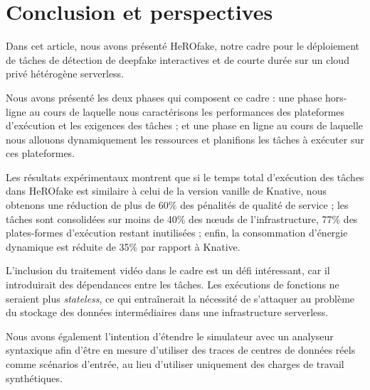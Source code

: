 \section{Conclusion et perspectives}

Dans cet article, nous avons présenté HeROfake, notre cadre pour le déploiement de tâches de détection de deepfake interactives et de courte durée sur un cloud privé hétérogène serverless.

Nous avons présenté les deux phases qui composent ce cadre : une phase hors-ligne au cours de laquelle nous caractérisons les performances des plateformes d'exécution et les exigences des tâches ; et une phase en ligne au cours de laquelle nous allouons dynamiquement les ressources et planifions les tâches à exécuter sur ces plateformes.

Les résultats expérimentaux montrent que si le temps total d'exécution des tâches dans HeROfake est similaire à celui de la version vanille de Knative, nous obtenons une réduction de plus de 60\% des pénalités de qualité de service ; les tâches sont consolidées sur moins de 40\% des nœuds de l'infrastructure, 77\% des plates-formes d'exécution restant inutilisées ; enfin, la consommation d'énergie dynamique est réduite de 35\% par rapport à Knative.

L'inclusion du traitement vidéo dans le cadre est un défi intéressant, car il introduirait des dépendances entre les tâches. Les exécutions de fonctions ne seraient plus \textit{stateless}, ce qui entraînerait la nécessité de s'attaquer au problème du stockage des données intermédiaires dans une infrastructure serverless.

Nous avons également l'intention d'étendre le simulateur avec un analyseur syntaxique afin d'être en mesure d'utiliser des traces de centres de données réels comme scénarios d'entrée, au lieu d'utiliser uniquement des charges de travail synthétiques.
